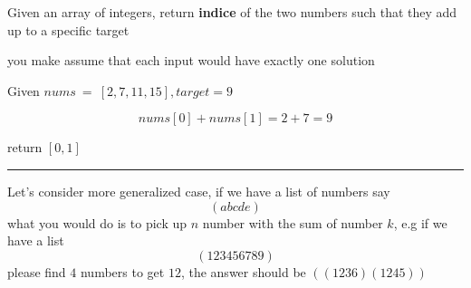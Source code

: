 Given an array of integers, return {\bf{indice}} of the two
numbers such that they add up to a specific target



you make assume that each input would have exactly one solution


Given $nums\ =\ [ 2, 7 ,11,15], target = 9$

$$nums[0]+nums[1]=2+7=9$$

return $[0,1]$
\hfill
\hrule
\hfill

Let's consider more generalized case, if we have a list of numbers say$$(a b c d e )$$what you would do is to pick up $n$ number with the sum of number $k$, e.g  if we have a list $$(1 2 3 4 5 6 7 8 9)$$
please find $4$ numbers  to get $12$, the answer should be
$(
        (1 2 3 6)
        (1 2 4 5)
)$

\bye